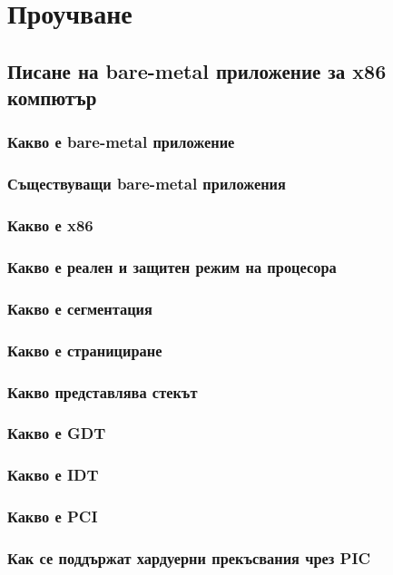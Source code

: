 \chapter{Проучване} %
\hfill
\section{Писане на bare-metal приложение за x86 компютър}
  \subsection{Какво е bare-metal приложение}
  \subsection{Съществуващи bare-metal приложения}
  \subsection{Какво е x86}
  \subsection{Какво е реален и защитен режим на процесора}
  \subsection{Какво е сегментация}
  \subsection{Какво е странициране}
  \subsection{Какво представлява стекът}
  \subsection{Какво е GDT}
  \subsection{Какво е IDT}
  \subsection{Какво е PCI}
  \subsection{Как се поддържат хардуерни прекъсвания чрез PIC}
